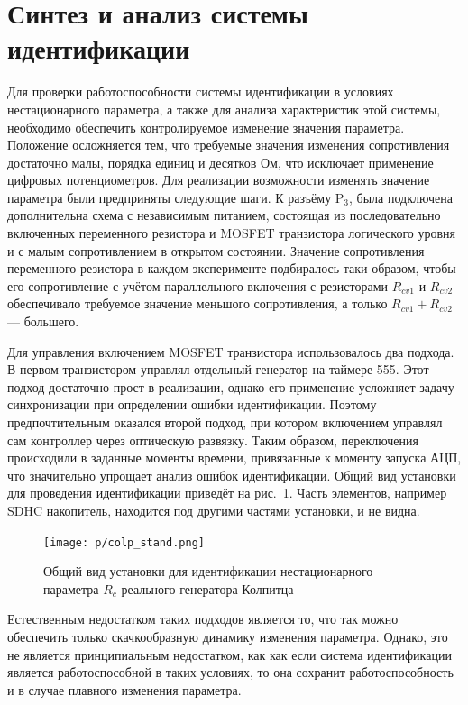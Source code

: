 
\section{Синтез и анализ системы идентификации}  %

Для проверки работоспособности системы идентификации
в условиях нестационарного параметра, а также
для анализа характеристик этой системы,
необходимо обеспечить контролируемое изменение значения параметра.
Положение осложняется тем, что требуемые значения изменения сопротивления достаточно малы,
порядка единиц и десятков Ом, что исключает применение
цифровых потенциометров. Для реализации возможности изменять значение параметра
были предприняты следующие шаги.
К разъёму $\mathrm{P}_3$, была подключена дополнительна схема с независимым питанием,
состоящая из последовательно включенных переменного резистора
и MOSFET транзистора логического уровня и с малым сопротивлением
в открытом состоянии. Значение сопротивления переменного резистора
в каждом эксперименте подбиралось таки образом, чтобы
его сопротивление с учётом параллельного включения с резисторами $R_{cv1}$ и $R_{cv2}$
обеспечивало требуемое значение меньшого сопротивления,
а только $R_{cv1} + R_{cv2}$ --- большего.

Для управления включением MOSFET транзистора использовалось два подхода.
В первом транзистором управлял отдельный генератор на таймере 555.
Этот подход достаточно прост в реализации, однако
его применение усложняет задачу синхронизации при
определении ошибки идентификации. Поэтому
предпочтительным оказался второй подход,
при котором включением управлял сам контроллер через
оптическую развязку. Таким образом, переключения
происходили в заданные моменты времени,
привязанные к моменту запуска АЦП, что значительно упрощает
анализ ошибок идентификации. Общий вид установки для
проведения идентификации приведёт на рис.~\ref{atu:f:colp_r_id_dev}.
Часть элементов, например SDHC накопитель, находится под
другими частями установки, и не видна.


\begin{figure}[htb!]
  \centerline{
    \texttt{[image: p/colp\_stand.png]}
  }
  \caption{Общий вид установки для идентификации нестационарного параметра $R_c$ реального генератора Колпитца }
  \label{atu:f:colp_r_id_dev}
\end{figure}

Естественным недостатком таких подходов является то, что
так можно обеспечить только скачкообразную динамику изменения параметра.
Однако, это не является принципиальным недостатком,
как как если система идентификации является работоспособной в таких условиях,
то она сохранит работоспособность и в случае плавного изменения параметра.

